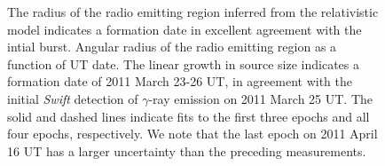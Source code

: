 \clearpage
\begin{figure}
\centerline{}
\caption[]{\small The radius of the radio emitting region inferred
from the relativistic model indicates a formation date in excellent 
agreement with the intial burst.  Angular radius of the
radio emitting region as a function of UT date.  The linear
growth in source size indicates a formation date of 2011 March 23-26
UT, in agreement with the initial {\it Swift}
detection of $\gamma$-ray emission on 2011 March 25 UT.  The solid and
dashed lines indicate fits to the first three epochs and all four
epochs, respectively.  We note that the last epoch on 2011 April 16 UT
has a larger uncertainty than the preceding measurements.}
\label{fig:vel} 
\end{figure}



